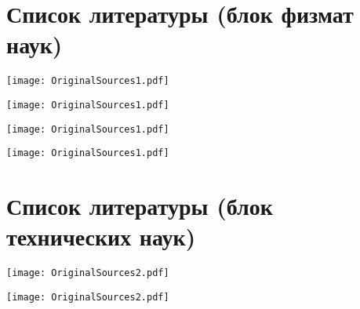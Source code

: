 \documentclass[main.tex]{subfiles}
\begin{document}
\setcounter{secnumdepth}{0}

\section{Список литературы (блок физмат наук)}

{\parindent0pt\texttt{[image: OriginalSources1.pdf]}}\newpage

{\parindent0pt\texttt{[image: OriginalSources1.pdf]}}\newpage

{\parindent0pt\texttt{[image: OriginalSources1.pdf]}}\newpage

{\parindent0pt\texttt{[image: OriginalSources1.pdf]}}


\section{Список литературы (блок технических наук)}

{\parindent0pt\texttt{[image: OriginalSources2.pdf]}}\newpage

{\parindent0pt\texttt{[image: OriginalSources2.pdf]}}\newpage
\end{document}
